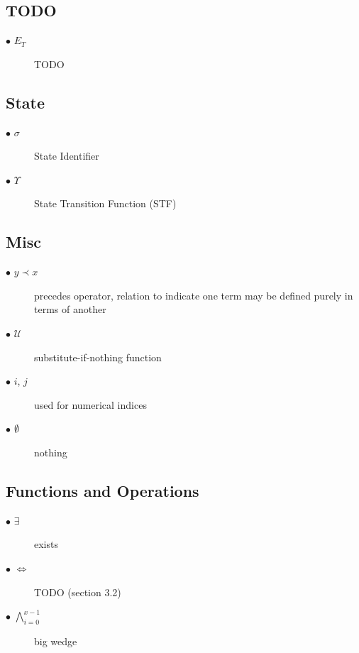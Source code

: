 \noindent

\subsection{TODO}\label{sec:todo}
\begin{description}
  \item[$\bullet$ ${E_T}$] TODO
\end{description}

\subsection{State}\label{sec:state}
\begin{description}
  \item[$\bullet$ $\sigma$] State Identifier
  \item[$\bullet$ $\Upsilon$] State Transition Function (STF)
\end{description}

\subsection{Misc}\label{sec:misc}
\begin{description}
  \item[$\bullet$ $y \prec x$] precedes operator, relation to indicate one term may be defined purely in terms of another
  \item[$\bullet$ $\mathcal{U}$] substitute-if-nothing function
  \item[$\bullet$ $i$, $j$] used for numerical indices
  \item[$\bullet$ $\emptyset$] nothing
\end{description}

\subsection{Functions and Operations}\label{sec:functions}
\begin{description}
  \item[$\bullet$ $\exists$] exists
  \item[$\bullet$ $\Longleftrightarrow$] TODO (section 3.2)
  \item[$\bullet$ $\bigwedge_{i=0}^{x-1}$] big wedge
\end{description}

